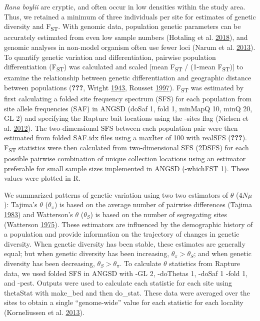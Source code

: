 \documentclass[proquest,12pt,final]{ucthesis-CA2012} %
\begin{document}
\begin{ucmainmatter}
\emph{Rana boylii} are cryptic, and often occur in low densities within
the study area. Thus, we retained a minimum of three individuals per
site for estimates of genetic diversity and F\textsubscript{ST}. With
genomic data, population genetic parameters can be accurately estimated
from even low sample numbers (Hotaling et al.
\protect\hyperlink{ref-hotaling_demographic_2018}{2018}), and genomic
analyses in non-model organism often use fewer loci (Narum et al.
\protect\hyperlink{ref-narum_genotyping-by-sequencing_2013}{2013}). To
quantify genetic variation and differentiation, pairwise population
differentiation (F\textsubscript{ST}) was calculated and scaled {[}mean
F\textsubscript{ST} / (1-mean F\textsubscript{ST}){]} to examine the
relationship between genetic differentiation and geographic distance
between populations ({\textbf{???}}, Wright
\protect\hyperlink{ref-wright_isolation_1943}{1943}, Rousset
\protect\hyperlink{ref-rousset_genetic_1997}{1997}). F\textsubscript{ST}
was estimated by first calculating a folded site frequency spectrum
(SFS) for each population from site allele frequencies (SAF) in ANGSD
(doSaf 1, fold 1, minMapQ 10, minQ 20, GL 2) and specifying the Rapture
bait locations using the -sites flag (Nielsen et al.
\protect\hyperlink{ref-nielsen_snp_2012}{2012}). The two-dimensional SFS
between each population pair were then estimated from folded SAF.idx
files using a maxIter of 100 with realSFS ({\textbf{???}}).
F\textsubscript{ST} statistics were then calculated from two-dimensional
SFS (2DSFS) for each possible pairwise combination of unique collection
locations using an estimator preferable for small sample sizes
implemented in ANGSD (-whichFST 1). These values were plotted in R.

We summarized patterns of genetic variation using two two estimators of
\(\theta\) (\(4N\mu\)): Tajima's \(\theta\) (\(\theta_\pi\)) is based on
the average number of pairwise differences (Tajima
\protect\hyperlink{ref-tajima_evolutionary_1983}{1983}) and Watterson's
\(\theta\) (\(\theta_S\)) is based on the number of segregating sites
(Watterson \protect\hyperlink{ref-watterson_number_1975}{1975}). These
estimators are influenced by the demographic history of a population and
provide information on the trajectory of changes in genetic diversity.
When genetic diversity has been stable, these estimates are generally
equal; but when genetic diversity has been increasing,
\(\theta_\pi > \theta_S\); and when genetic diversity has been
decreasing, \(\theta_S > \theta_\pi\). To calculate \(\theta\)
statistics from Rapture data, we used folded SFS in ANGSD with -GL 2,
-doThetas 1, -doSaf 1 -fold 1, and -pest. Outputs were used to calculate
each statistic for each site using thetaStat with make\_bed and then
do\_stat. These data were averaged over the sites to obtain a single
``genome-wide'' value for each statistic for each locality (Korneliussen
et al. \protect\hyperlink{ref-korneliussen_calculation_2013}{2013}).


\end{ucmainmatter}
\end{document}
